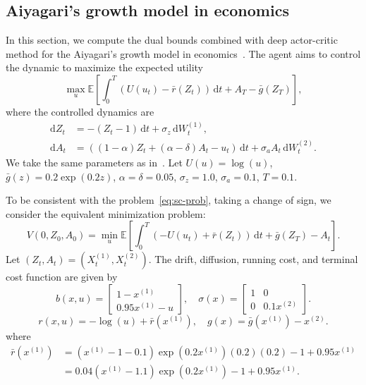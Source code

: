 \documentclass[11pt]{article}
\numberwithin{equation}{section}
\theoremstyle{plain}
\theoremstyle{definition}
\theoremstyle{remark}
\newcommand{\bE}{\mathbb{E}}
\newcommand{\dd}{\mathrm{d}}
\begin{document}
\subsection{Aiyagari's growth model in economics}
In this section, we compute the dual bounds combined with deep actor-critic method for the Aiyagari's growth model in economics~\cite{zhou2024solving}. The agent aims to control the dynamic to maximize the expected utility 
\begin{equation*}
    \max_{u}\bE\left[ \int_0^T (U(u_t) - \bar{r}(Z_t))\,\dd t + A_T - \bar{g}(Z_T) \right],
\end{equation*}
where the controlled dynamics are 
\begin{equation*}
    \begin{aligned}
        \dd Z_t &= -(Z_t - 1)\,\dd t + \sigma_z\,\dd W_t^{(1)}, \\
        \dd A_t &= ((1-\alpha)Z_t + (\alpha - \delta)A_t - u_t) \,\dd t + \sigma_a A_t \,\dd W_t^{(2)}. 
    \end{aligned}
\end{equation*}
We take the same parameters as in~\cite[Section 6.2]{zhou2024solving}. Let $U(u) = \log(u)$, $\bar{g}(z) = 0.2\exp(0.2z)$, $\alpha = \delta = 0.05$, $\sigma_z = 1.0$, $\sigma_a = 0.1$, $T=0.1$. 

To be consistent with the problem~\eqref{eq:sc-prob}, taking a change of sign, we consider the equivalent minimization problem: 
\begin{equation*}
    V(0,Z_0, A_0) =\min_u \bE\left[ \int_0^T (-U(u_t) + \bar{r}(Z_t))\,\dd t + \bar{g}(Z_T) - A_t \right].
\end{equation*}
Let $(Z_t, A_t) = (X_t^{(1)}, X_t^{(2)})$. The drift, diffusion, running cost, and terminal cost function are given by 
\begin{equation*}
    b(x,u) = \begin{bmatrix}
        1-x^{(1)} \\
        0.95x^{(1)} - u
    \end{bmatrix}, \quad \sigma(x) = \begin{bmatrix}
        1 & 0 \\
        0 & 0.1x^{(2)}
    \end{bmatrix}.
\end{equation*}
\begin{equation*}
    r(x,u) = -\log(u) + \bar{r}(x^{(1)}), \quad g(x) = \bar{g}(x^{(1)})- x^{(2)}. 
\end{equation*}
where 
\begin{equation*}
\begin{aligned}
    \bar{r}(x^{(1)}) &= (x^{(1)} - 1 - 0.1)\exp(0.2 x^{(1)})(0.2)(0.2) - 1 + 0.95 x^{(1)} \\
    &= 0.04(x^{(1)} - 1.1)\exp(0.2 x^{(1)}) - 1 + 0.95 x^{(1)}. 
\end{aligned}
\end{equation*}
\end{document}
